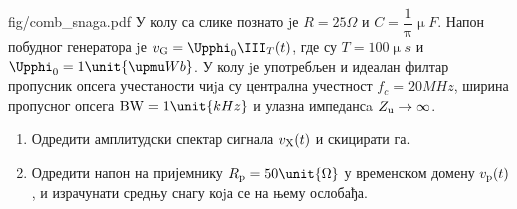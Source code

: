 \mnDifficult
\begin{slikaDesno}[.833]{fig/comb_snaga.pdf}
    \PID
    У колу са слике познато jе 
    $R = 25\unit{\Omega}$ и 
    $C = \dfrac{1}{\uppi} \unit{\upmu F}$.
    Напон побудног генератора jе 
    $v_{\rm G} = \Upphi_0 \III_T (t)$, где су 
    $T =100\unit{\upmu s}$ и 
    $\Upphi_0 = 1\unit{\upmu Wb}$. 
    У колу jе употребљен и идеалан филтар пропусник опсега учестаности чиjа су централна
    учестност 
    $f_c = 20\unit{MHz}$, ширина пропусног опсега 
    ${\rm BW} = 1\unit{kHz}$ и улазна импедансa 
    $Z_{\rm u} \to \infty$. 
\end{slikaDesno}

\begin{enumerate}[label=(\alph*)]
    \item Одредити амплитудски спектар сигнала $v_{\rm X}(t)$ и скицирати га.
    \item Одредити напон на пријемнику $R_{\rm p} = 50\unit{\Omega}$ у временском домену $v_{\rm p}(t)$, и израчунати 
    средњу снагу коjа се на њему ослобађа. 
    
\end{enumerate}

\RESENJE


